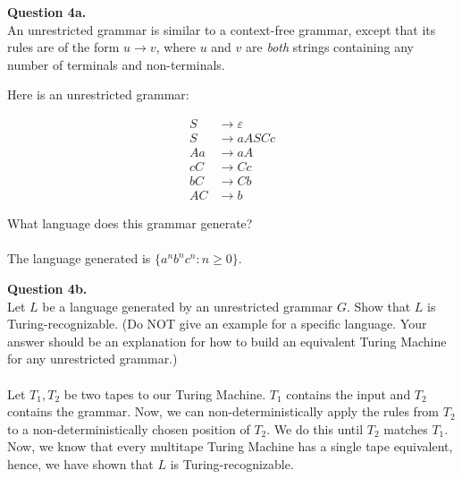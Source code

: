 \documentclass{article}
\newcommand{\set}[1]{\{#1\}}
\renewcommand{\epsilon}{\varepsilon}
\newenvironment{question}[2]
{
    {\large \textbf{Question #1.}}\\
    #2\\\\
}{\newpage}
\begin{document}
\begin{question}
    {4a}
    {An unrestricted grammar is similar to a context-free grammar, except that its rules are of the form $u \rightarrow v$,
        where $u$ and $v$ are \emph{both} strings containing any number of terminals and non-terminals.

        Here is an unrestricted grammar:

        \begin{align*}
            S  & \rightarrow \epsilon \\
            S  & \rightarrow aASCc    \\
            Aa & \rightarrow aA       \\
            cC & \rightarrow Cc       \\
            bC & \rightarrow Cb       \\
            AC & \rightarrow b
        \end{align*}

        What language does this grammar generate?
    }
    The language generated is $\set{a^nb^nc^n: n\geq 0}$.
\end{question}

\begin{question}
    {4b}
    {Let $L$ be a language generated by an unrestricted grammar $G$. Show that $L$ is Turing-recognizable.
        (Do NOT give an example for a specific language. Your answer should be an explanation for how to build an equivalent Turing Machine for any
        unrestricted grammar.)}

    Let $T_1, T_2$ be two tapes to our Turing Machine. $T_1$ contains the input and $T_2$ contains the grammar. Now, we can non-deterministically apply
    the rules from $T_2$ to a non-deterministically chosen position of $T_2$. We do this until $T_2$ matches $T_1$. Now, we know that every multitape
    Turing Machine has a single tape equivalent, hence, we have shown that $L$ is Turing-recognizable.
\end{question}
\end{document}
